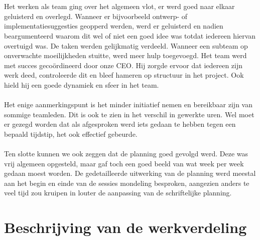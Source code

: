 \documentclass[]{penoverslag}
\begin{document}
\\
\\
Het werken als team ging over het algemeen vlot, er werd goed naar elkaar geluisterd en overlegd. Wanneer er bijvoorbeeld ontwerp- of implementatiesuggesties geopperd werden, werd er geluisterd en nadien beargumenteerd waarom dit wel of niet een goed idee was totdat iedereen hiervan overtuigd was. De taken werden gelijkmatig verdeeld. Wanneer een subteam op onverwachte moeilijkheden stuitte, werd meer hulp toegevoegd. Het team werd met succes geco\"ordineerd door onze CEO. Hij zorgde ervoor dat iedereen zijn werk deed, controleerde dit en bleef hameren op structuur in het project. Ook hield hij een goede dynamiek en sfeer in het team.
\\
\\
Het enige aanmerkingspunt is het minder initiatief nemen en bereikbaar zijn van sommige teamleden. Dit is ook te zien in het verschil in gewerkte uren. Wel moet er gezegd worden dat als afgesproken werd iets gedaan te hebben tegen een bepaald tijdstip, het ook effectief gebeurde.
\\
\\
Ten slotte kunnen we ook zeggen dat de planning goed gevolgd werd. Deze was vrij algemeen opgesteld, maar gaf toch een goed beeld van wat week per week gedaan moest worden. De gedetailleerde uitwerking van de planning werd meestal aan het begin en einde van de sessies mondeling besproken, aangezien anders te veel tijd zou kruipen in louter de aanpassing van de schriftelijke planning.

\section{Beschrijving van de werkverdeling}
\end{document}
